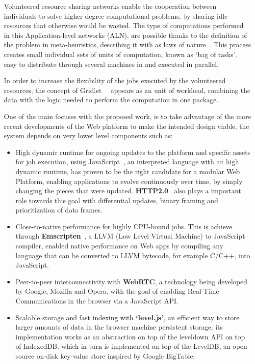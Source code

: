 Volunteered resource sharing networks enable the cooperation between individuals to solve higher degree computational problems, by sharing idle resources that otherwise would be wasted. The type of computations performed in this Application-level networks (ALN), are possible thanks to the definition of the problem in meta-heuristics, describing it with as laws of nature~\cite{Duda2013}. This process creates small individual sets of units of computation, known as `bag of tasks', easy to distribute through several machines in and executed in parallel.

In order to increase the flexibility of the jobs executed by the volunteered resources, the concept of Gridlet~\cite{Costa2012}~\cite{Rodrigues} appears as an unit of workload, combining the data with the logic needed to perform the computation in one package.

One of the main focuses with the proposed work, is to take advantage of the more recent developments of the Web platform to make the intended design viable, the system depends on very lower level components such as:
\begin{itemize}
  \item High dynamic runtime for ongoing updates to the platform and specific assets for job execution, using JavaScript~\cite{Ecma2009}, an interpreted language with an high dynamic runtime, has proven to be the right candidate for a modular Web Platform, enabling applications to evolve continuously over time, by simply changing the pieces that were updated. \textbf{HTTP2.0}~\cite{Thomson2013} also plays a important role towards this goal with differential updates, binary framing and prioritization of data frames.
  \item Close-to-native performance for highly CPU-bound jobs. This is achieve through \textbf{Emscripten}~\cite{Zakai2011}, a LLVM (Low Level Virtual Machine) to JavaScript compiler, enabled native performance on Web apps by compiling any language that can be converted to LLVM bytecode, for example C/C++, into JavaScript.
  \item Peer-to-peer interconnectivity with \textbf{WebRTC}, a technology being developed by Google, Mozilla and Opera, with the goal of enabling Real-Time Communications in the browser via a JavaScript API.
  \item Scalable storage and fast indexing with \textbf{`level.js'}, an efficient way to store larger amounts of data in the browser machine persistent storage, its implementation works as an abstraction on top of the leveldown API on top of IndexedDB, which in turn is implemented on top of the LevelDB, an open source on-disk key-value store inspired by Google BigTable.
\end{itemize}

